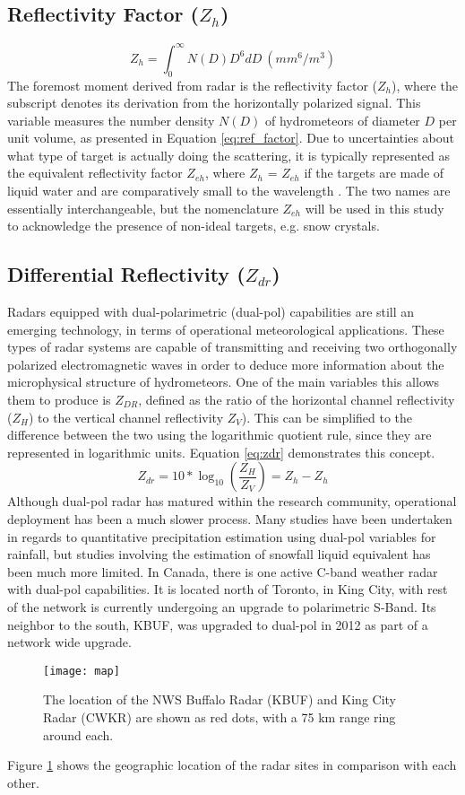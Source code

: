 \subsection{Reflectivity Factor ($Z_{h}$)}
\begin{equation}\label{eq:ref_factor}
Z_{h} = \int_0^{\infty} N(D)D^6dD \ (mm^6/m^3)
\end{equation}
The foremost moment derived from radar is the reflectivity factor ($Z_{h}$), where the
subscript denotes its derivation from the horizontally polarized signal. This variable
measures the number density $N(D)$ of hydrometeors of diameter $D$ per unit volume, as
presented in Equation \ref{eq:ref_factor}. Due to uncertainties about what type of
target is actually doing the scattering, it is typically represented as the equivalent
reflectivity factor $Z_{eh}$, where $Z_{h}$ = $Z_{eh}$ if the targets are made of liquid 
water and are comparatively small to the wavelength \citep{Fabry2015}. The two names are 
essentially interchangeable, but the nomenclature $Z_{eh}$ will be used in this study to 
acknowledge the presence of non-ideal targets, e.g. snow crystals.
\subsection{Differential Reflectivity ($Z_{dr}$)}
Radars equipped with dual-polarimetric (dual-pol) capabilities are still an emerging technology, in terms of operational meteorological applications. These types of radar systems are capable of transmitting and receiving two orthogonally polarized electromagnetic waves in order to deduce more information about the microphysical structure of hydrometeors. One of the main variables this allows them to produce is $Z_{DR}$, defined as the ratio of the horizontal channel reflectivity ($Z_H$) to the vertical channel reflectivity $Z_{V}$). This can be simplified to the difference between the two using the logarithmic quotient rule, since they are represented in logarithmic units. Equation \ref{eq:zdr} demonstrates this concept.
\begin{equation}\label{eq:zdr}
Z_{dr} = 10 * \log_{10}(\frac{Z_H}{Z_V}) = Z_h - Z_h
\end{equation}
Although dual-pol radar has matured within the research community, operational deployment has been a much slower process. Many studies have been undertaken in regards to quantitative precipitation estimation using dual-pol variables for rainfall, but studies involving the estimation of snowfall liquid equivalent has been much more limited. In Canada, there is one active C-band weather radar with dual-pol capabilities. It is located north of Toronto, in King City, with rest of the network is currently undergoing an upgrade to polarimetric S-Band. Its neighbor to the south, KBUF, was upgraded to dual-pol in 2012 as part of a network wide upgrade. 
\begin{figure}[h]
\texttt{[image: map]}
\caption{The location of the NWS Buffalo Radar (KBUF) and King City Radar (CWKR) are shown as red dots, with a 75 km range ring around each.} 
\label{map}
\end{figure}
Figure \ref{map} shows the geographic location of the radar sites in comparison with each other.

 



